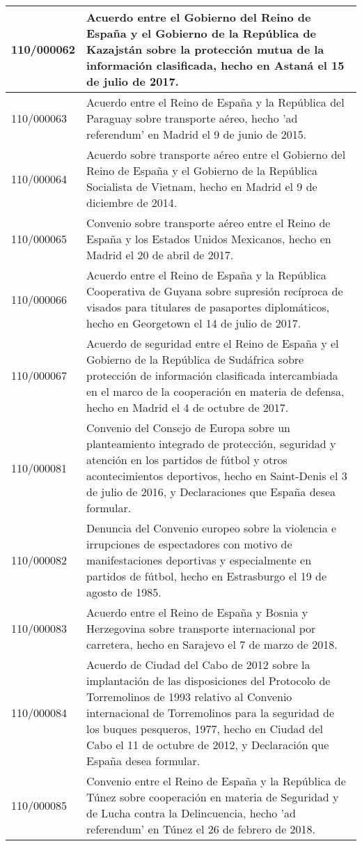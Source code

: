 {\begin{table}[H]
\begin{center}
\begin{tabularx}{\linewidth}{| l | X |}
\hline
110/000062 & Acuerdo entre el Gobierno del Reino de España y el Gobierno de la República de Kazajstán sobre la protección mutua de la información clasificada, hecho en Astaná el 15 de julio de 2017. \\
\hline
110/000063 & Acuerdo entre el Reino de España y la República del Paraguay sobre transporte aéreo, hecho 'ad referendum' en Madrid el 9 de junio de 2015. \\
\hline
110/000064 & Acuerdo sobre transporte aéreo entre el Gobierno del Reino de España y el Gobierno de la República Socialista de Vietnam, hecho en Madrid el 9 de diciembre de 2014. \\
\hline
110/000065 & Convenio sobre transporte aéreo entre el Reino de España y los Estados Unidos Mexicanos, hecho en Madrid el 20 de abril de 2017. \\
\hline
110/000066 & Acuerdo entre el Reino de España y la República Cooperativa de Guyana sobre supresión recíproca de visados para titulares de pasaportes diplomáticos, hecho en Georgetown el 14 de julio de 2017. \\
\hline
110/000067 & Acuerdo de seguridad entre el Reino de España y el Gobierno de la República de Sudáfrica sobre protección de información clasificada intercambiada en el marco de la cooperación en materia de defensa, hecho en Madrid el 4 de octubre de 2017. \\
\hline
110/000081 & Convenio del Consejo de Europa sobre un planteamiento integrado de protección, seguridad y atención en los partidos de fútbol y otros acontecimientos deportivos, hecho en Saint-Denis el 3 de julio de 2016, y Declaraciones que España desea formular. \\
\hline
110/000082 & Denuncia del Convenio europeo sobre la violencia e irrupciones de espectadores con motivo de manifestaciones deportivas y especialmente en partidos de fútbol, hecho en Estrasburgo el 19 de agosto de 1985. \\
\hline
110/000083 & Acuerdo entre el Reino de España y Bosnia y Herzegovina sobre transporte internacional por carretera, hecho en Sarajevo el 7 de marzo de 2018. \\
\hline
110/000084 & Acuerdo de Ciudad del Cabo de 2012 sobre la implantación de las disposiciones del Protocolo de Torremolinos de 1993 relativo al Convenio internacional de Torremolinos para la seguridad de los buques pesqueros, 1977, hecho en Ciudad del Cabo el 11 de octubre de 2012, y Declaración que España desea formular. \\
\hline
110/000085 & Convenio entre el Reino de España y la República de Túnez sobre cooperación en materia de Seguridad y de Lucha contra la Delincuencia, hecho 'ad referendum' en Túnez el 26 de febrero de 2018. \\

\end{tabularx}
\end{center}
\end{table}}
